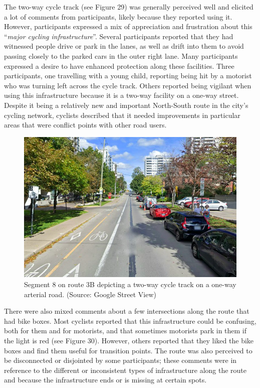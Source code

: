\documentclass[]{elsarticle} %
\begin{document}
The two-way cycle track (see Figure 29) was generally perceived well and
elicited a lot of comments from participants, likely because they
reported using it. However, participants expressed a mix of appreciation
and frustration about this ``\emph{major cycling infrastructure}''.
Several participants reported that they had witnessed people drive or
park in the lanes, as well as drift into them to avoid passing closely
to the parked cars in the outer right lane. Many participants expressed
a desire to have enhanced protection along these facilities. Three
participants, one travelling with a young child, reporting being hit by
a motorist who was turning left across the cycle track. Others reported
being vigilant when using this infrastructure because it is a two-way
facility on a one-way street. Despite it being a relatively new and
important North-South route in the city's cycling network, cyclists
described that it needed improvements in particular areas that were
conflict points with other road users.

\begin{figure}

{\centering \includegraphics[width=0.65\linewidth]{Figure 28} 

}

\caption{Segment 8 on route 3B depicting a two-way cycle track on a one-way arterial road. (Source: Google Street View)}\label{fig:figure-29}
\end{figure}

There were also mixed comments about a few intersections along the route
that had bike boxes. Most cyclists reported that this infrastructure
could be confusing, both for them and for motorists, and that sometimes
motorists park in them if the light is red (see Figure 30). However,
others reported that they liked the bike boxes and find them useful for
transition points. The route was also perceived to be disconnected or
disjointed by some participants; these comments were in reference to the
different or inconsistent types of infrastructure along the route and
because the infrastructure ends or is missing at certain spots.
\end{document}
